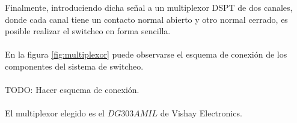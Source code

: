 \documentclass[main]{subfiles}
\begin{document}
Finalmente, introduciendo dicha señal a un multiplexor DSPT de dos canales, donde cada canal tiene un contacto normal abierto y otro normal cerrado, es posible realizar el switcheo en forma sencilla.\\
\\
En la figura \ref{fig:multiplexor} puede observarse el esquema de conexión de los componentes del sistema de switcheo.\\
\\
TODO: Hacer esquema de conexión.\\
\\
El multiplexor elegido es el $DG303AMIL$ de Vishay Electronics.
\end{document}
